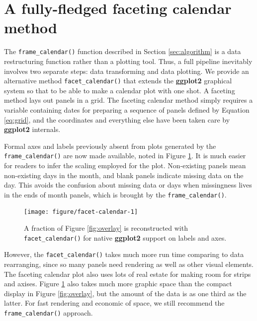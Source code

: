 \documentclass[12pt]{article}
\begin{document}
\hypertarget{sec:facet-calendar}{%
\section{A fully-fledged faceting calendar method}\label{sec:facet-calendar}}

The \texttt{frame\_calendar()} function described in Section \ref{sec:algorithm} is a data restructuring function rather than a plotting tool. Thus, a full pipeline inevitably involves two separate steps: data transforming and data plotting. We provide an alternative method \texttt{facet\_calendar()} that extends the \textbf{ggplot2} graphical system so that to be able to make a calendar plot with one shot. A faceting method lays out panels in a grid. The faceting calendar method simply requires a variable containing dates for preparing a sequence of panels defined by Equation \eqref{eq:grid}, and the coordinates and everything else have been taken care by \textbf{ggplot2} internals.

Formal axes and labels previously absent from plots generated by the \texttt{frame\_calendar()} are now made available, noted in Figure \ref{fig:facet-calendar}. It is much easier for readers to infer the scaling employed for the plot. Non-existing panels mean non-existing days in the month, and blank panels indicate missing data on the day. This avoids the confusion about missing data or days when missingness lives in the ends of month panels, which is brought by the \texttt{frame\_calendar()}.

\begin{figure}

{\centering \texttt{[image: figure/facet-calendar-1]} 

}

\caption{A fraction of Figure \ref{fig:overlay} is reconstructed with \texttt{facet\_calendar()} for native \textbf{ggplot2} support on labels and axes.}\label{fig:facet-calendar}
\end{figure}



However, the \texttt{facet\_calendar()} takes much more run time comparing to data rearranging, since so many panels need rendering as well as other visual elements. The faceting calendar plot also uses lots of real estate for making room for strips and axises. Figure \ref{fig:facet-calendar} also takes much more graphic space than the compact display in Figure \ref{fig:overlay}, but the amount of the data is as one third as the latter. For fast rendering and economic of space, we still recommend the \texttt{frame\_calendar()} approach.
\end{document}
